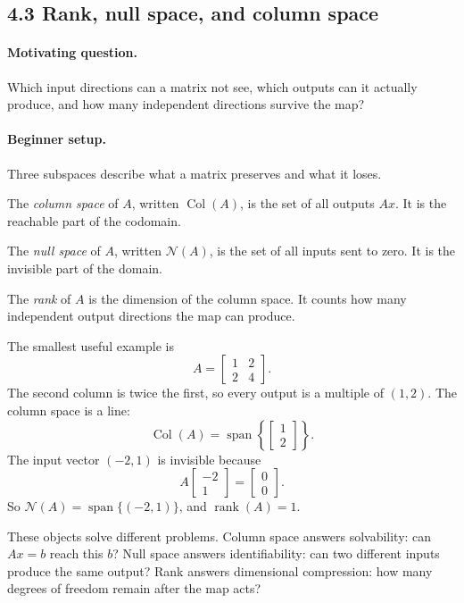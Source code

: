 \subsection{4.3 Rank, null space, and column space}

\paragraph{Motivating question.}
Which input directions can a matrix not see, which outputs can it actually produce, and how many independent directions survive the map?

\paragraph{Beginner setup.}
Three subspaces describe what a matrix preserves and what it loses.

The \emph{column space} of \(A\), written \(\operatorname{Col}(A)\), is the set of all outputs \(Ax\). It is the reachable part of the codomain.

The \emph{null space} of \(A\), written \(\mathcal{N}(A)\), is the set of all inputs sent to zero. It is the invisible part of the domain.

The \emph{rank} of \(A\) is the dimension of the column space. It counts how many independent output directions the map can produce.

The smallest useful example is
\[
A=
\begin{bmatrix}
1&2\\
2&4
\end{bmatrix}.
\]
The second column is twice the first, so every output is a multiple of \((1,2)\). The column space is a line:
\[
\operatorname{Col}(A)=\operatorname{span}\left\{\begin{bmatrix}1\\2\end{bmatrix}\right\}.
\]
The input vector \((-2,1)\) is invisible because
\[
A\begin{bmatrix}-2\\1\end{bmatrix}
=
\begin{bmatrix}0\\0\end{bmatrix}.
\]
So \(\mathcal{N}(A)=\operatorname{span}\{(-2,1)\}\), and \(\operatorname{rank}(A)=1\).

These objects solve different problems. Column space answers solvability: can \(Ax=b\) reach this \(b\)? Null space answers identifiability: can two different inputs produce the same output? Rank answers dimensional compression: how many degrees of freedom remain after the map acts?

